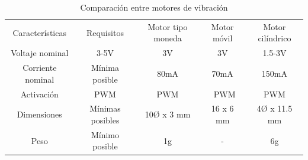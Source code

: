 \begin{table}[H]
\centering
\caption{Comparación entre motores de vibración}
\label{tab:4.Caracteristicas motor}
\begin{tabular}{|c|c||c|c|c|} 
\hline
Características   & Requisitos       & Motor tipo moneda & Motor móvil & Motor cilíndrico  \\ 
\hhline{|==::===|}
Voltaje nominal   & 3-5V             & 3V                & 3V          & 1.5-3V            \\ 
\hline
Corriente nominal & Mínima posible   & 80mA              & 70mA        & 150mA             \\ 
\hline
Activación        & PWM              & PWM               & ~PWM        & PWM               \\ 
\hline
Dimensiones       & Mínimas posibles & 10Ø x 3 mm        & 16 x 6 mm   & 4Ø x 11.5 mm      \\ 
\hline
Peso              & Mínimo posible   & 1g                & -           & 6g                \\
\hline
\end{tabular}
\end{table}


